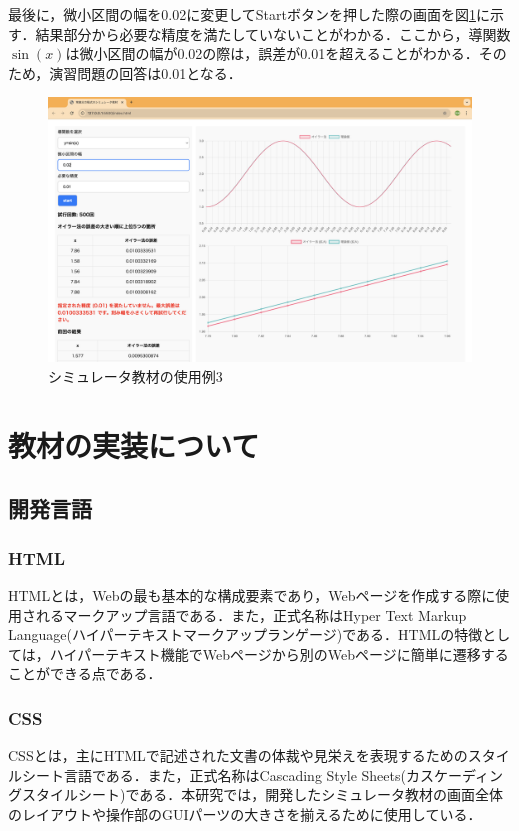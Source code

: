 \documentclass[a4paper, 12pt]{ltjsarticle}
\begin{document}
\clearpage

最後に，微小区間の幅を0.02に変更してStartボタンを押した際の画面を図\ref{fig:シミュレータ教材の使用例3}に示す．結果部分から必要な精度を満たしていないことがわかる．ここから，導関数$\sin(x)$は微小区間の幅が0.02の際は，誤差が0.01を超えることがわかる．そのため，演習問題の回答は0.01となる．

\begin{figure}[h]
\begin{center}
\includegraphics[clip,width=\textwidth,keepaspectratio]{sim-sample4.png}
\end{center}
\caption{シミュレータ教材の使用例3}
\label{fig:シミュレータ教材の使用例3}
\end{figure}
\clearpage
\section{教材の実装について}
\subsection{開発言語}
\subsubsection{HTML}
HTMLとは，Webの最も基本的な構成要素であり，Webページを作成する際に使用されるマークアップ言語である．また，正式名称はHyper Text Markup Language(ハイパーテキストマークアップランゲージ)である．HTMLの特徴としては，ハイパーテキスト機能でWebページから別のWebページに簡単に遷移することができる点である．
\subsubsection{CSS}
CSSとは，主にHTMLで記述された文書の体裁や見栄えを表現するためのスタイルシート言語である．また，正式名称はCascading Style Sheets(カスケーディングスタイルシート)である．本研究では，開発したシミュレータ教材の画面全体のレイアウトや操作部のGUIパーツの大きさを揃えるために使用している．
\end{document}
